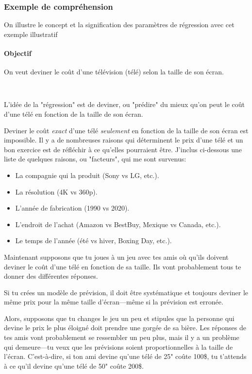 \documentclass[10pt, french]{article}
\begin{document}
\begin{multicols*}{2}
\subsubsection*{Exemple de compréhension}

On illustre le concept et la signification des paramètres de régression avec cet exemple illustratif

\paragraph{Objectif}	On veut deviner le coût d'une télévision (télé) selon la taille de son écran.

\

L'idée de la "régression" est de deviner, ou "prédire" du mieux qu'on peut le coût d'une télé en fonction de la taille de son écran.

Deviner le coût \textit{exact} d'une télé \textit{seulement} en fonction de la taille de son écran est impossible. Il y a de nombreuses raisons qui déterminent le prix d'une télé et un bon exercice est de réfléchir à ce qu'elles pourraient être. 
J'inclus ci-dessous une liste de quelques raisons, ou "facteurs", qui me sont survenus:
\begin{itemize}[leftmargin = *]
	\item	La compagnie qui la produit (Sony vs LG, etc.).
	\item	La résolution (4K vs 360p).
	\item	L'année de fabrication (1990 vs 2020).
	\item	L'endroit de l'achat (Amazon vs BestBuy, Mexique vs Canada, etc.).
	\item	Le temps de l'année (été vs hiver, Boxing Day, etc.).
\end{itemize}

Maintenant supposons que tu joues à un jeu avec tes amis où qu'ils doivent deviner le coût d'une télé en fonction de sa taille. Ils vont probablement tous te donner des différentes réponses.

Si tu crées un modèle de prévision, il doit être systématique et toujours deviner le même prix pour la même taille d'écran---même si la prévision est erronée. 

Alors, supposons que tu changes le jeu un peu et stipules que la personne qui devine le prix le plus éloigné doit prendre une gorgée de sa bière. Les réponses de tes amis vont probablement se ressembler un peu plus, mais il y a un problème qui demeure---tu veux que les prévisions soient proportionnelles à la taille de l'écran. C'est-à-dire, si ton ami devine qu'une télé de 25" coûte 100\$, tu t'attends à ce qu'il devine qu'une télé de 50" coûte 200\$.


\end{multicols*}
\end{document}
